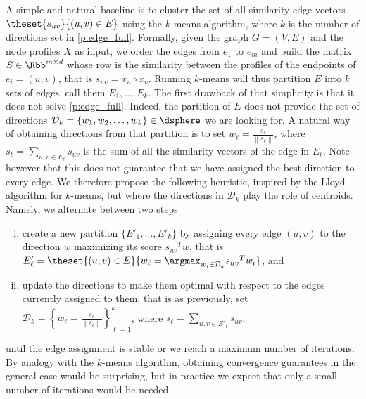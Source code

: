 A simple and natural baseline is to cluster the set of all similarity edge vectors $
\theset{s_{uv}}{(u,v) \in E}$ using the $k$-means algorithm, where $k$ is the number of directions
set in \autoref{p:edge_full}. Formally, given the graph $G=(V,E)$ and the node profiles $X$ as
input, we order the edges from $e_1$ to $e_m$ and build the matrix $S \in \Rbb^{m\times d}$ whose
\ith{} row is the similarity between the profiles of the endpoints of $e_i=(u,v)$, that is $s_{uv} =
x_u \circ x_v$. Running $k$-means will thus partition $E$ into $k$ sets of edges, call them $E_1,
\ldots, E_k$. The first drawback of that simplicity is that it does not solve \autoref{p:edge_full}.
Indeed, the partition of $E$ does not provide the set of directions $\mathcal{D}_k = \{w_1, w_2,
\ldots, w_k\} \in \dsphere$ we are looking for. A natural way of obtaining directions from that
partition is to set $w_\ell = \frac{s_\ell}{\left\|s_\ell\right\|}$, where $s_\ell = \sum_{u,v \in
E_\ell} s_{uv}$ is the sum of all the similarity vectors of the edge in $E_\ell$. Note however that
this does not guarantee that we have assigned the best direction to every edge. We therefore propose
the following heuristic, inspired by the Lloyd algorithm for $k$-means, but where the directions in
$\mathcal{D}_k$ play the role of centroids. Namely, we alternate between two steps
\begin{enumerate}[(i), nosep]
  \item create a new partition $\{E'_1, \ldots, E'_k\}$ by assigning every edge $(u,v)$ to the
    direction $w$ maximizing its score ${s_{uv}}^T w$, that is $E'_\ell = \theset{(u,v) \in E}{
    w_\ell = \argmax_{w_i \in \mathcal{D}_k} {s_{uv}}^T w_i}$, and
  \item update the directions to make them optimal with respect to the edges currently assigned to
    them, that is as previously, set $\mathcal{D}_k = \left\{ w_\ell = \frac{s_\ell}{\left\| s_\ell
    \right\|}\right\}_{\ell=1}^k $, where $s_\ell = \sum_{u,v \in E'_\ell} s_{uv}$,
\end{enumerate}
until the edge assignment is stable or we reach a maximum number of iterations. By analogy with the
$k$-means algorithm, obtaining convergence guarantees in the general case would be surprising, but in
practice we expect that only a small number of iterations would be needed.
